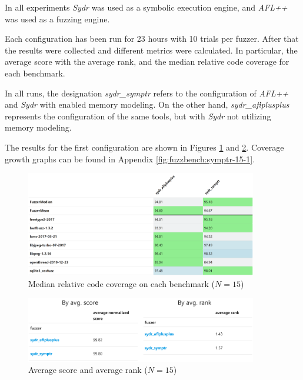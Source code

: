 In all experiments \textit{Sydr} was used as a symbolic execution engine, and \textit{AFL++} was used as a fuzzing engine.

Each configuration has been run for 23 hours with 10 trials per fuzzer. After that the results were collected and different metrics were calculated. In particular, the average score with the average rank, and the median relative code coverage for each benchmark.

In all runs, the designation \textit{sydr\_symptr} refers to the configuration of \textit{AFL++} and \textit{Sydr} with enabled memory modeling. On the other hand, \textit{sydr\_aflplusplus} represents the configuration of the same tools, but with \textit{Sydr} not utilizing memory modeling.


The results for the first configuration are shown in Figures \ref{fig:fuzzbench-symptr-15-1-coverage} and \ref{fig:fuzzbench-symptr-15-1-score-rank}. Coverage growth graphs can be found in Appendix \ref{fig:fuzzbench:symptr-15-1}.

\begin{figure}[h]
    \centering
    \includegraphics[width=0.9\textwidth]{assets/fuzzbench/symptr-15-1/median-relative-code-coverage-on-each-benchmark.png}
    \caption{Median relative code coverage on each benchmark ($N=15$)}
    \label{fig:fuzzbench-symptr-15-1-coverage}
\end{figure}

\begin{figure}[h]
    \centering
    \includegraphics[width=0.9\textwidth]{assets/fuzzbench/symptr-15-1/avg-score-avg-rank.png}
    \caption{Average score and average rank ($N=15$)}
    \label{fig:fuzzbench-symptr-15-1-score-rank}
\end{figure}

